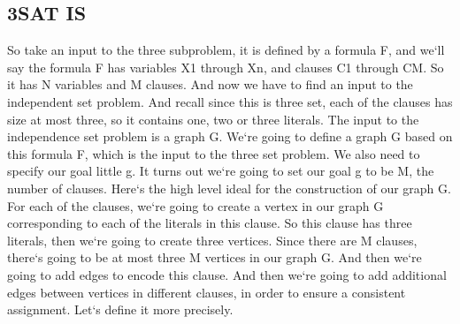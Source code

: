 \subsection{3SAT  IS}
So take an input to the three subproblem, it is defined by a formula F, and we`ll say the formula F has variables X1 through Xn, and clauses C1 through CM\@.
So it has N variables and M clauses.
And now we have to find an input to the independent set problem.
And recall since this is three set, each of the clauses has size at most three, so it contains one, two or three literals.
The input to the independence set problem is a graph G\@.
We`re going to define a graph G based on this formula F, which is the input to the three set problem.
We also need to specify our goal little g.
It turns out we`re going to set our goal g to be M, the number of clauses.
Here`s the high level ideal for the construction of our graph G\@.
For each of the clauses, we`re going to create a vertex in our graph G corresponding to each of the literals in this clause.
So this clause has three literals, then we`re going to create three vertices.
Since there are M clauses, there`s going to be at most three M vertices in our graph G\@.
And then we`re going to add edges to encode this clause.
And then we`re going to add additional edges between vertices in different clauses, in order to ensure a consistent assignment.
Let`s define it more precisely.

